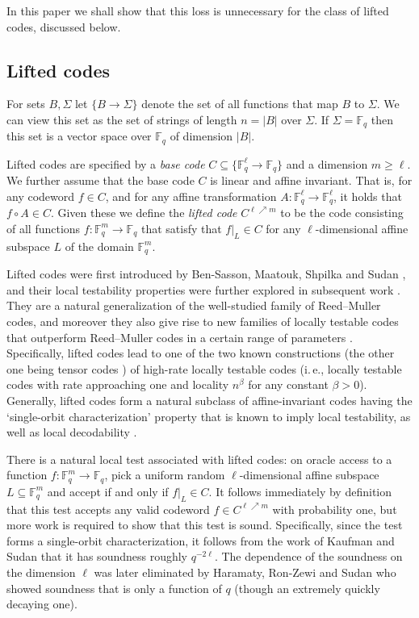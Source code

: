 \documentclass[11pt]{article}
\numberwithin{equation}{section}
\theoremstyle{definition}
\theoremstyle{plain}
\newcommand{\ie}{i.\,e.}
\theoremstyle{plain}
\newcommand{\F}{{\mathbb{F}}}
\begin{document}
In this %
paper %
we shall show that this loss is unnecessary for the class of lifted codes, discussed below.

\subsection{Lifted codes}

%
%
For sets $B,\Sigma$ let $\{B \to \Sigma\}$ denote the
set of all functions that map $B$ to $\Sigma$.
We can view this set as the set of strings of
length $n=|B|$ over $\Sigma$.
If $\Sigma=\F_q$ then this set is a vector space over
$\F_q$ of dimension $|B|$.   %

Lifted codes are specified by a \emph{base code} 
$C \subseteq \{\F_q^\ell \to \F_q\}$ and a dimension $m \geq \ell$.
We further assume that the base code $C$ is linear and
%
%
affine invariant.   %
That is, for any codeword $f \in C$, 
and for any affine transformation $A: \F_q^\ell \to \F_q^\ell$,
it holds that $f \circ A \in C$.
Given these we define the \emph{lifted code} $C^{\ell \nearrow m}$ to be the code consisting of all functions $f: \F_q^m \to \F_q$ that satisfy that $f|_L \in C$ for any $\ell$-dimensional affine subspace $L$
of the domain $\F_q^m$.  %
%

Lifted codes were first introduced by Ben-Sasson, Maatouk, Shpilka and Sudan \cite{BenSassonMSS2011}, and their local testability properties were further explored in subsequent work  \cite{GuoKS2013,HaramatyRS2015,GuoHS2015}.
They are a natural generalization of the well-studied family of Reed--Muller codes, and moreover they also give rise to new families of locally testable codes that outperform Reed--Muller codes in a certain range of parameters \cite{GuoKS2013}. Specifically, lifted codes lead to one of the two known constructions (the other one being tensor codes \cite{BenSassonS2006,BenSassonV2015,Viderman2015,KoppartyMRS2017}) of high-rate locally testable codes (\ie, locally testable codes with rate approaching one and
%
%
locality $n^{\beta}$ for any constant $\beta>0$). 
%
Generally, lifted codes
form a natural subclass of affine-invariant codes %
%
having  %
the `single-orbit characterization' %
property that is known to imply local testability, as well as local decodability \cite{KaufmanS2008}.

There is a natural local test associated with lifted codes: on oracle access to a function $f: \F_q^m \to \F_q$, pick a uniform random $\ell$-dimensional affine subspace %
$L\subseteq \F_q^m$  %
and accept if and only if $f|_L \in C$. It follows immediately by definition that this test accepts any valid codeword $f \in C^{\ell \nearrow m}$ with probability one, but more work is required to show that this test is sound. Specifically, since the test forms a
%
single-orbit   %
characterization, it follows from  the work of Kaufman and Sudan \cite{KaufmanS2008} that it has soundness roughly $q^{- 2\ell}$. The dependence of the soundness on the dimension $\ell$ was later eliminated by Haramaty, Ron-Zewi and Sudan \cite{HaramatyRS2015} who showed soundness that is only a function of $q$ (though an extremely quickly decaying one).
\end{document}

